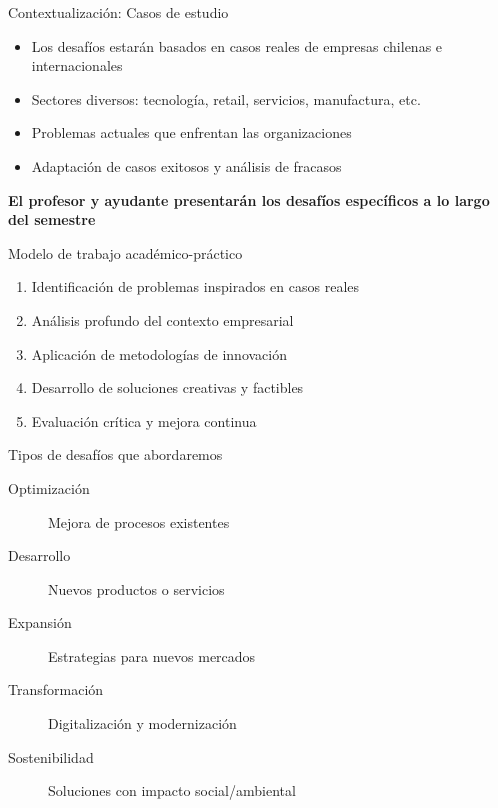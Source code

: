 \documentclass[10pt]{beamer}
\begin{document}
\begin{frame}{Contextualización: Casos de estudio}
    \begin{itemize}
        \item Los desafíos estarán basados en casos reales de empresas chilenas e internacionales
        \item Sectores diversos: tecnología, retail, servicios, manufactura, etc.
        \item Problemas actuales que enfrentan las organizaciones
        \item Adaptación de casos exitosos y análisis de fracasos
    \end{itemize}
    
    \vspace{1cm}
    \begin{center}
    \textbf{El profesor y ayudante presentarán los desafíos específicos a lo largo del semestre}
    \end{center}
\end{frame}

\begin{frame}{Modelo de trabajo académico-práctico}
    \begin{enumerate}
        \item Identificación de problemas inspirados en casos reales
        \item Análisis profundo del contexto empresarial
        \item Aplicación de metodologías de innovación
        \item Desarrollo de soluciones creativas y factibles
        \item Evaluación crítica y mejora continua
    \end{enumerate}
\end{frame}

\begin{frame}{Tipos de desafíos que abordaremos}
    \begin{description}
        \item[Optimización] Mejora de procesos existentes
        \item[Desarrollo] Nuevos productos o servicios
        \item[Expansión] Estrategias para nuevos mercados
        \item[Transformación] Digitalización y modernización
        \item[Sostenibilidad] Soluciones con impacto social/ambiental
    \end{description}
\end{frame}
\end{document}
